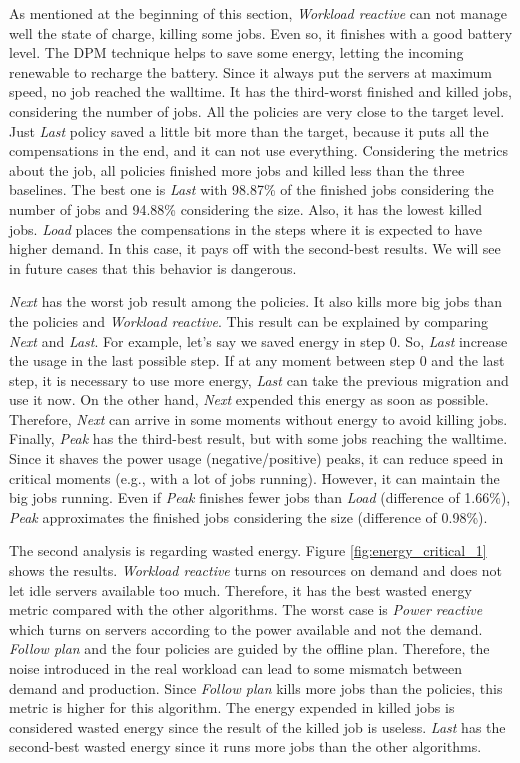 As mentioned at the beginning of this section, \emph{Workload reactive} can not manage well the state of charge, killing some jobs. Even so, it finishes with a good battery level. The DPM technique helps to save some energy, letting the incoming renewable to recharge the battery. Since it always put the servers at maximum speed, no job reached the walltime. It has the third-worst finished and killed jobs, considering the number of jobs. All the policies are very close to the target level. Just \emph{Last} policy saved a little bit more than the target, because it puts all the compensations in the end, and it can not use everything. Considering the metrics about the job, all policies finished more jobs and killed less than the three baselines. The best one is \emph{Last} with 98.87\% of the finished jobs considering the number of jobs and 94.88\% considering the size. Also, it has the lowest killed jobs. \emph{Load} places the compensations in the steps where it is expected to have higher demand. In this case, it pays off with the second-best results. We will see in future cases that this behavior is dangerous. 

\emph{Next} has the worst job result among the policies. It also kills more big jobs than the policies and \emph{Workload reactive}. This result can be explained by comparing \emph{Next} and \emph{Last}. For example, let's say we saved energy in step 0. So, \emph{Last} increase the usage in the last possible step. If at any moment between step 0 and the last step, it is necessary to use more energy, \emph{Last} can take the previous migration and use it now. On the other hand, \emph{Next} expended this energy as soon as possible. Therefore, \emph{Next} can arrive in some moments without energy to avoid killing jobs. Finally, \emph{Peak} has the third-best result, but with some jobs reaching the walltime. Since it shaves the power usage (negative/positive) peaks, it can reduce speed in critical moments (e.g., with a lot of jobs running). However, it can maintain the big jobs running. Even if \emph{Peak} finishes fewer jobs than \emph{Load} (difference of 1.66\%), \emph{Peak} approximates the finished jobs considering the size (difference of 0.98\%).

The second analysis is regarding wasted energy. Figure \ref{fig:energy_critical_1} shows the results. \emph{Workload reactive} turns on resources on demand and does not let idle servers available too much. Therefore, it has the best wasted energy metric compared with the other algorithms. The worst case is \emph{Power reactive} which turns on servers according to the power available and not the demand. \emph{Follow plan} and the four policies are guided by the offline plan. Therefore, the noise introduced in the real workload can lead to some mismatch between demand and production. Since \emph{Follow plan} kills more jobs than the policies, this metric is higher for this algorithm. The energy expended in killed jobs is considered wasted energy since the result of the killed job is useless. \emph{Last} has the second-best wasted energy since it runs more jobs than the other algorithms.

